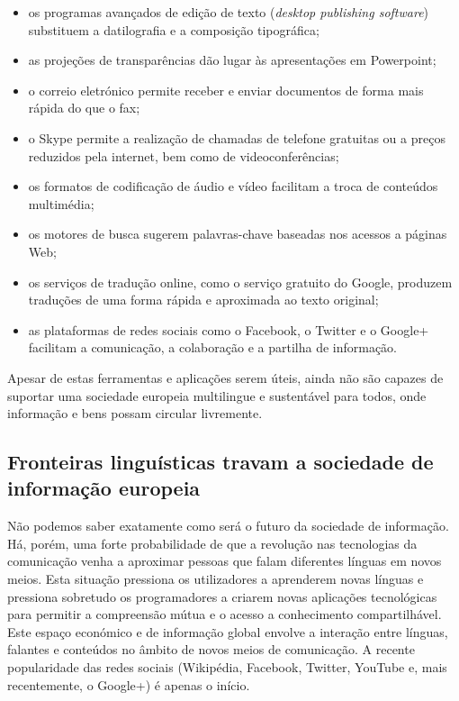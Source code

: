\begin{multicols}{2}
\begin{itemize}
      \item os programas avançados de edição de texto (\textit{desktop publishing software}) substituem a datilografia e a composição tipográfica;
      \item as projeções de transparências dão lugar às apresentações em Powerpoint;
      \item o correio eletrónico permite receber e enviar do\-cu\-men\-tos de forma mais rápida do que o fax;
      \item o Skype permite a realização de chamadas de telefone gratuitas ou a preços reduzidos pela internet, bem como de videoconferências;
      \item os formatos de codificação de áudio e vídeo facilitam a troca de conteúdos multimédia;
      \item os motores de busca sugerem palavras-chave baseadas nos acessos a páginas Web;
      \item os serviços de tradução online, como o serviço gratuito do Google, produzem traduções de uma forma rápida e aproximada ao texto original;
      \item as plataformas de redes sociais como o Facebook, o Twitter e o Google+  facilitam a comunicação, a colaboração e a partilha de informação.
\end{itemize}

 Apesar de estas ferramentas e aplicações serem úteis, ainda não são capazes de suportar uma sociedade europeia multilingue e sustentável para todos, onde informação e bens possam circular livremente.

\subsection{Fronteiras linguísticas travam a sociedade de in\-for\-ma\-ção eu\-ro\-peia}
  
Não podemos saber exatamente como será o futuro da sociedade de informação. Há, porém, uma forte probabilidade de que a revolução nas tecnologias da comunicação venha a aproximar pessoas que falam diferentes línguas em novos meios. Esta situação pressiona os utilizadores a aprenderem novas línguas e pressiona sobretudo os programadores a criarem novas aplicações tecnológicas para permitir a compreensão mútua e o acesso a conhecimento compartilhável. Este espaço económico e de informação global envolve a interação entre línguas, falantes e conteúdos no âmbito de novos meios de comunicação. A recente popularidade das redes sociais (Wikipédia, Facebook, Twitter, YouTube e, mais recentemente, o Google+) é apenas o início. 


\end{multicols}
